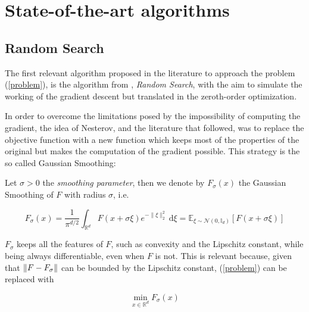 
\chapter{State-of-the-art algorithms}\label{chapt:2}

\section{Random Search}\label{sect:Nesterov}

The first relevant algorithm proposed in the literature to approach the problem (\ref{problem}), is the algorithm from \cite{nesterov2017random}, \textit{Random Search}, with the aim to simulate
the working of the gradient descent but translated in the zeroth-order optimization.

In order to overcome the limitations posed by the impossibility of computing the gradient, the idea of Nesterov, and the
literature that followed, was to replace the objective function with a new function which keeps most of the
properties of the original but makes the computation of the gradient possible. This strategy is the so called Gaussian Smoothing:

\begin{defn}\label{GaussianSmoothingDefn}

	Let $\sigma > 0$ the \textit{smoothing parameter}, then we denote by $F_\sigma (x)$ the Gaussian Smoothing of $F$ with radius $\sigma$, i.e.
	
	\begin{equation}
		F_{\sigma}(x)=\frac{1}{\pi^{d / 2}} \int_{\mathbb{R}^{d}} F(x+\sigma \xi) e^{-\|\xi\|_{2}^{2}} \mathrm{~d} \xi=\mathbb{E}_{\xi \sim \mathcal{N}\left(0, \mathbb{I}_{d}\right)}[F(x+\sigma \xi)]
	\end{equation}
	
\end{defn}

$F_\sigma$ keeps all the features of $F$, such as convexity and the Lipschitz constant, while being always differentiable, even when $F$ is not. This is relevant because, given that $\left\lVert F - F_\sigma\right\rVert$ can be bounded by the Lipschitz constant, (\ref{problem}) can be replaced with

\begin{equation}\label{SmoothedProblem}
    \min _{x \in \mathbb{R}^{d}} F_\sigma (x)  
\end{equation}


